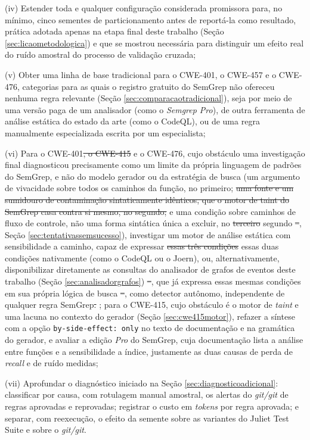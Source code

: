 \documentclass[
    12pt,                %
    openright,           %
    oneside,             %
    a4paper,             %
    english,             %
    brazil               %
]{abntex2}
\newcommand{\antigo}[1]{\sout{#1}}
\newcommand{\novo}[1]{{\color{red}#1}}
\begin{document}
\par
(iv) Estender toda e qualquer configuração considerada promissora para, no mínimo, cinco sementes de particionamento antes de reportá-la como resultado, prática adotada apenas na etapa final deste trabalho (Seção \ref{sec:licaometodologica}) e que se mostrou necessária para distinguir um efeito real do ruído amostral do processo de validação cruzada; 
\par
(v) Obter uma linha de base tradicional para o CWE-401, o CWE-457 e o CWE-476, categorias para as quais o registro gratuito do SemGrep não ofereceu nenhuma regra relevante (Seção \ref{sec:comparacaotradicional}), seja por meio de uma versão paga de um analisador (como o \textit{Semgrep Pro}), de outra ferramenta de análise estática do estado da arte (como o CodeQL), ou de uma regra manualmente especializada escrita por um especialista; 
\par
(vi) Para o CWE-401\antigo{, o CWE-415} e o CWE-476, cujo obstáculo uma investigação final diagnosticou precisamente como um limite da própria linguagem de padrões do SemGrep, e não do modelo gerador ou da estratégia de busca (um argumento de vivacidade sobre todos os caminhos da função, no primeiro; \antigo{uma fonte e um sumidouro de contaminação sintaticamente idênticos, que o motor de taint do SemGrep casa contra si mesmo, no segundo;} e uma condição sobre caminhos de fluxo de controle, não uma forma sintática única a excluir, no \antigo{terceiro} \novo{segundo}\antigo{ --}\novo{,} Seção \ref{sec:tentativassemsucesso}), investigar um motor de análise estática com sensibilidade a caminho, capaz de expressar \antigo{essas três condições} \novo{essas duas condições} nativamente (como o CodeQL ou o Joern), ou, alternativamente, disponibilizar diretamente as consultas do analisador de grafos de eventos deste trabalho (Seção \ref{sec:analisadorgrafos})\antigo{ --}\novo{,} que já expressa essas mesmas condições em sua própria lógica de busca\antigo{ --}\novo{,} como detector autônomo, independente de qualquer regra SemGrep\antigo{.} \novo{; para o CWE-415, cujo obstáculo é o motor de \textit{taint} e uma lacuna no contexto do gerador (Seção \ref{sec:cwe415motor}), refazer a síntese com a opção \texttt{by-side-effect: only} no texto de documentação e na gramática do gerador, e avaliar a edição \textit{Pro} do SemGrep, cuja documentação lista a análise entre funções e a sensibilidade a índice, justamente as duas causas de perda de \textit{recall} e de ruído medidas;}
\par
\novo{(vii) Aprofundar o diagnóstico iniciado na Seção \ref{sec:diagnosticoadicional}: classificar por causa, com rotulagem manual amostral, os alertas do \textit{git/git} de regras aprovadas e reprovadas; registrar o custo em \textit{tokens} por regra aprovada; e separar, com reexecução, o efeito da semente sobre as variantes do Juliet Test Suite e sobre o \textit{git/git}.}
\end{document}
